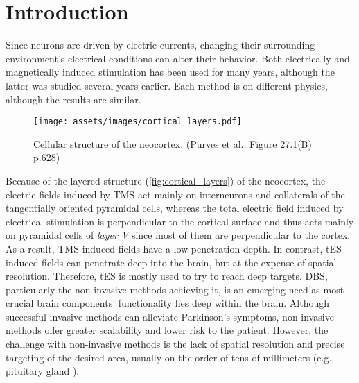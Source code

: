 \pagebreak
{}
\chapter{Introduction}
Since neurons are driven by electric currents, changing their surrounding environment's electrical conditions can alter their behavior. Both electrically and magnetically induced stimulation has been used for many years, although the latter was studied several years earlier. Each method is on different physics, although the results are similar.

\begin{wrapfigure}{l}{0.40\textwidth}
    \centering
    \texttt{[image: assets/images/cortical\_layers.pdf]}
    \caption{Cellular structure of the neocortex. (Purves et al.\cite{Purves2012}, Figure 27.1(B) p.628)}
    \label{fig:cortical_layers}
\end{wrapfigure}

Because of the layered structure (\autoref{fig:cortical_layers}) of the neocortex, the electric fields induced by \gls{TMS} act mainly on interneurons and collaterals of the tangentially oriented pyramidal cells, whereas the total electric field induced by electrical stimulation is perpendicular to the cortical surface and thus acts mainly on pyramidal cells of \textit{layer V} since most of them are perpendicular to the cortex. As a result, \gls{TMS}-induced fields have a low penetration depth. In contrast, \gls{tES} induced fields can penetrate deep into the brain, but at the expense of spatial resolution. Therefore, \gls{tES} is mostly used to try to reach deep targets.
\gls{DBS}, particularly the non-invasive methods achieving it, is an emerging need as most crucial brain components' functionality lies deep within the brain. Although successful invasive methods can alleviate Parkinson's symptoms, non-invasive methods offer greater scalability and lower risk to the patient. However, the challenge with non-invasive methods is the lack of spatial resolution and precise targeting of the desired area, usually on the order of tens of millimeters (e.g., pituitary gland \cite{Yadav2017_pituitary}).

